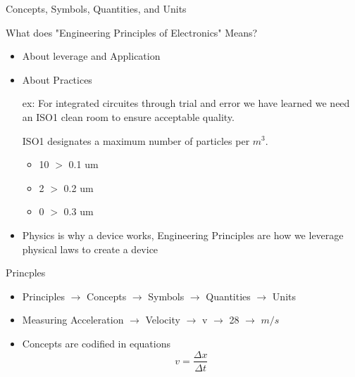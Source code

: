 \documentclass{report}
\begin{document}
\begin{description}
\begin{mdframed}
\begin{itemize}
            \end{itemize}
        \end{mdframed}
        \pagebreak
    \item Concepts, Symbols, Quantities, and Units
        \begin{mdframed}
            {\large What does "Engineering Principles of 
            Electronics" Means?}
            \begin{itemize}
                \item About leverage and Application
                \item About Practices
                    \begin{mdframed}
                        ex: For integrated circuites through
                        trial and error we have learned we need
                        an ISO1 clean room to ensure acceptable
                        quality.

                        ISO1 designates a maximum number of
                        particles per $m^3$.
                        \begin{itemize}
                            \item 10 $>$ 0.1 um
                            \item 2 $>$ 0.2 um
                            \item 0 $>$ 0.3 um
                        \end{itemize}
                    \end{mdframed}
                \item Physics is why a device works, Engineering
                    Principles are how we leverage physical
                    laws to create a device
            \end{itemize}

            {\large Princples}
            \begin{itemize}
                \item Principles $\to$ Concepts $\to$ 
                    Symbols $\to$ Quantities
                    $\to$ Units
                \item Measuring Acceleration $\to$
                    Velocity $\to$ v $\to$ 28
                    $\to$ $m/s$
                \item Concepts are codified in equations
                   \begin{displaymath}
                        v = \frac{\Delta x}{\Delta t}
                   \end{displaymath}


\end{itemize}
\end{mdframed}
\end{description}
\end{document}
